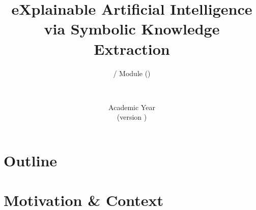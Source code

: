 \documentclass[presentation]{beamer}\mode<presentation>{\usetheme{AMSBolognaFC}}
\title[\currentLab{} -- XAI via SKE]{
    eXplainable Artificial Intelligence via Symbolic Knowledge Extraction
}
\subtitle{\courseName{} / Module \moduleN{} (\courseAcronym)}
\author[\sspeaker{\gcShort}]{\speaker{\gcFull} \\ \gcEmail}
\institute[\disiShort, \uniboShort]{\disi{} (\disiShort)\\\unibo}
\date[A.Y. \academicYear{} (v.\ \version)]{Academic Year \academicYear{}\\(version \version)}
\begin{document}

\frame{\titlepage}

\section*{Outline}
%
\frame[c]{\tableofcontents[hideallsubsections]}

\section{Motivation \& Context}
\end{document}
